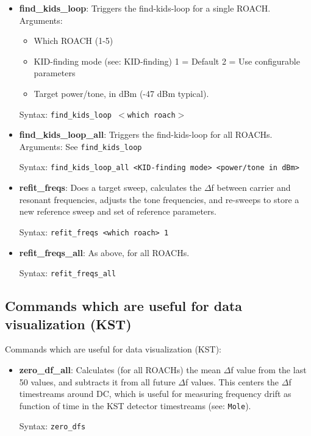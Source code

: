 \begin{itemize}[leftmargin=*,label={}]
\item \textbf{find\_kids\_loop}: Triggers the find-kids-loop for a single ROACH.
Arguments:
\begin{itemize}
  \item Which ROACH (1-5)
  \item KID-finding mode (see: KID-finding)
    1 = Default
    2 = Use configurable parameters
  \item Target power/tone, in dBm (-47 dBm typical).
  \end{itemize}

Syntax: \texttt{find\_kids\_loop $<$which roach$>$}

\item \textbf{find\_kids\_loop\_all}: Triggers the find-kids-loop for all ROACHs.
Arguments: See \texttt{find\_kids\_loop}

Syntax: \texttt{find\_kids\_loop\_all <KID-finding mode> <power/tone in dBm>}

\item \textbf{refit\_freqs}: Does a target sweep, calculates the $\Delta$f between carrier and resonant frequencies, adjusts the tone frequencies, and re-sweeps to store a new reference sweep and set of reference parameters.

Syntax: \texttt{refit\_freqs <which roach> 1}

\item \textbf{refit\_freqs\_all}: As above, for all ROACHs.

Syntax: \texttt{refit\_freqs\_all}

\end{itemize}

\subsection{Commands which are useful for data visualization (KST)}
Commands which are useful for data visualization (KST):

\begin{itemize}[leftmargin=*,label={}]

\item \textbf{zero\_df\_all}: Calculates (for all ROACHs) the mean $\Delta$f value from the last 50 values, and subtracts it from all future $\Delta$f values. This centers the $\Delta$f timestreams around DC, which is useful for measuring frequency drift as function of time in the KST detector timestreams (see: \texttt{Mole}).

Syntax: \texttt{zero\_dfs}

\end{itemize}

